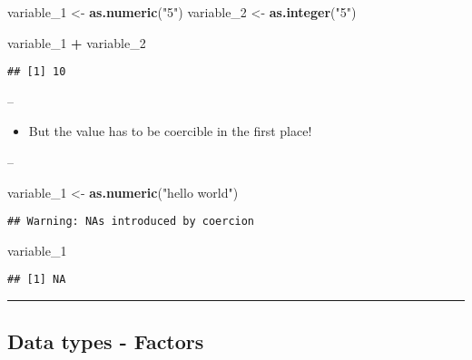 \documentclass[]{article}
\newenvironment{Shaded}{\begin{snugshade}}{\end{snugshade}}
\newcommand{\DecValTok}[1]{\textcolor[rgb]{0.00,0.00,0.81}{#1}}
\newcommand{\KeywordTok}[1]{\textcolor[rgb]{0.13,0.29,0.53}{\textbf{#1}}}
\newcommand{\NormalTok}[1]{#1}
\newcommand{\OperatorTok}[1]{\textcolor[rgb]{0.81,0.36,0.00}{\textbf{#1}}}
\newcommand{\StringTok}[1]{\textcolor[rgb]{0.31,0.60,0.02}{#1}}
\providecommand{\tightlist}{%
  \setlength{\itemsep}{0pt}\setlength{\parskip}{0pt}}
\begin{document}
\begin{Shaded}
\begin{Highlighting}[]
\NormalTok{variable_}\DecValTok{1}\NormalTok{ <-}\StringTok{ }\KeywordTok{as.numeric}\NormalTok{(}\StringTok{"5"}\NormalTok{)}
\NormalTok{variable_}\DecValTok{2}\NormalTok{ <-}\StringTok{ }\KeywordTok{as.integer}\NormalTok{(}\StringTok{"5"}\NormalTok{)}

\NormalTok{variable_}\DecValTok{1} \OperatorTok{+}\StringTok{ }\NormalTok{variable_}\DecValTok{2}
\end{Highlighting}
\end{Shaded}

\begin{verbatim}
## [1] 10
\end{verbatim}

--

\begin{itemize}
\tightlist
\item
  But the value has to be coercible in the first place!
\end{itemize}

--

\begin{Shaded}
\begin{Highlighting}[]
\NormalTok{variable_}\DecValTok{1}\NormalTok{ <-}\StringTok{ }\KeywordTok{as.numeric}\NormalTok{(}\StringTok{"hello world"}\NormalTok{)}
\end{Highlighting}
\end{Shaded}

\begin{verbatim}
## Warning: NAs introduced by coercion
\end{verbatim}

\begin{Shaded}
\begin{Highlighting}[]
\NormalTok{variable_}\DecValTok{1}
\end{Highlighting}
\end{Shaded}

\begin{verbatim}
## [1] NA
\end{verbatim}

\begin{center}\rule{0.5\linewidth}{\linethickness}\end{center}

\hypertarget{data-types---factors}{%
\subsection{Data types - Factors}\label{data-types---factors}}
\end{document}
